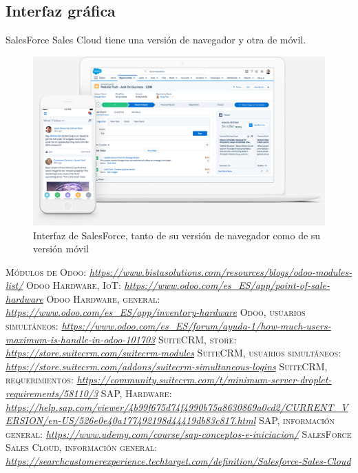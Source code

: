 \documentclass[openany,overnay,a4paper, twoside, 12pt]{book}
\begin{document}
\subsection{Interfaz gráfica}
SalesForce Sales Cloud tiene una versión de navegador y otra de móvil. 
\begin{figure}[h]
    \centering
    \includegraphics[scale=0.4]{sgeI/Salesforce.jpg}
    \caption{Interfaz de SalesForce, tanto de su versión de navegador como de su versión móvil}
    \label{fig:my_label}
\end{figure}
\begin{thebibliography}{X}
 \textsc{Módulos de Odoo}:
\textit{\url{https://www.bistasolutions.com/resources/blogs/odoo-modules-list/}}
 \textsc{Odoo Hardware, IoT}:
\textit{\url{https://www.odoo.com/es_ES/app/point-of-sale-hardware}}
 \textsc{Odoo Hardware, general}:
\textit{\url{https://www.odoo.com/es_ES/app/inventory-hardware}}
 \textsc{Odoo, usuarios simultáneos}:
\textit{\url{https://www.odoo.com/es_ES/forum/ayuda-1/how-much-users-maximum-is-handle-in-odoo-101703}}
 \textsc{SuiteCRM, store}:
\textit{\url{https://store.suitecrm.com/suitecrm-modules}}
 \textsc{SuiteCRM, usuarios simultáneos}:
\textit{\url{https://store.suitecrm.com/addons/suitecrm-simultaneous-logins}}
 \textsc{SuiteCRM, requerimientos}:
\textit{\url{https://community.suitecrm.com/t/minimum-server-droplet-requirements/58110/3}}
 \textsc{SAP, Hardware}:
\textit{\url{https://help.sap.com/viewer/4b99f675d74f4990b75a8630869a0cd2/CURRENT_VERSION/en-US/526e0e40a177492198d44419db83c817.html}}
 \textsc{SAP, información general}:
\textit{\url{https://www.udemy.com/course/sap-conceptos-e-iniciacion/}}
 \textsc{SalesForce Sales Cloud, información general}:
\textit{\url{https://searchcustomerexperience.techtarget.com/definition/Salesforce-Sales-Cloud}}

\end{thebibliography}
\end{document}
